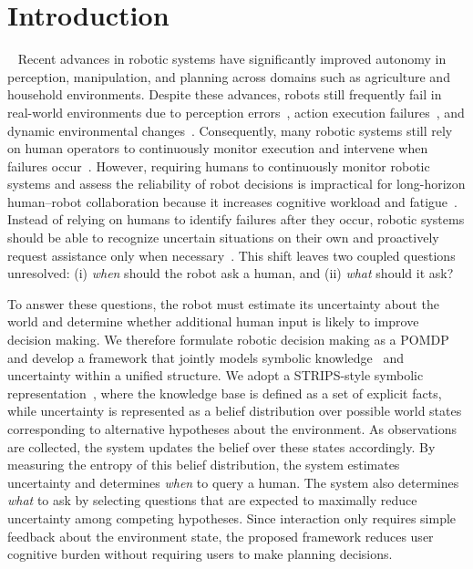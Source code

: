 \section{Introduction}~\label{intro}
Recent advances in robotic systems have significantly improved autonomy in perception, manipulation, and planning across domains such as agriculture and household environments. Despite these advances, robots still frequently fail in real-world environments due to perception errors~\cite{kaipa2016addressing}, action execution failures~\cite{kaelbling1998planning}, and dynamic environmental changes~\cite{kurniawati2016online}. Consequently, many robotic systems still rely on human operators to continuously monitor execution and intervene when failures occur~\cite{dragan2013legibility, goodrich2008human}. However, requiring humans to continuously monitor robotic systems and assess the reliability of robot decisions is impractical for long-horizon human--robot collaboration because it increases cognitive workload and fatigue~\cite{chen2014human}. Instead of relying on humans to identify failures after they occur, robotic systems should be able to recognize uncertain situations on their own and proactively request assistance only when necessary~\cite{sadigh2017active, leusmann2023understanding}. This shift leaves two coupled questions unresolved: (i) \textit{when} should the robot ask a human, and (ii) \textit{what} should it ask?


To answer these questions, the robot must estimate its uncertainty about the world and determine whether additional human input is likely to improve decision making. We therefore formulate robotic decision making as a POMDP~\cite{kaelbling1998planning} and develop a framework that jointly models symbolic knowledge~\cite{davis1993knowledge} and uncertainty within a unified structure. We adopt a STRIPS-style symbolic representation~\cite{fikes1971strips}, where the knowledge base is defined as a set of explicit facts, while uncertainty is represented as a belief distribution over possible world states corresponding to alternative hypotheses about the environment. As observations are collected, the system updates the belief over these states accordingly. By measuring the entropy of this belief distribution, the system estimates uncertainty and determines \textit{when} to query a human. The system also determines \textit{what} to ask by selecting questions that are expected to maximally reduce uncertainty among competing hypotheses. Since interaction only requires simple feedback about the environment state, the proposed framework reduces user cognitive burden without requiring users to make planning decisions.



